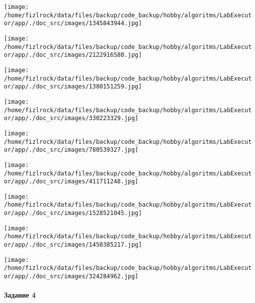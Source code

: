 \documentclass[a4paper, 12pt]{article}
\begin{document}
\texttt{[image: /home/fizlrock/data/files/backup/code\_backup/hobby/algoritms/LabExecutor/app/./doc\_src/images/1345843944.jpg]}

\texttt{[image: /home/fizlrock/data/files/backup/code\_backup/hobby/algoritms/LabExecutor/app/./doc\_src/images/2122916580.jpg]}

\texttt{[image: /home/fizlrock/data/files/backup/code\_backup/hobby/algoritms/LabExecutor/app/./doc\_src/images/1380151259.jpg]}

\texttt{[image: /home/fizlrock/data/files/backup/code\_backup/hobby/algoritms/LabExecutor/app/./doc\_src/images/330223329.jpg]}

\texttt{[image: /home/fizlrock/data/files/backup/code\_backup/hobby/algoritms/LabExecutor/app/./doc\_src/images/780539327.jpg]}

\texttt{[image: /home/fizlrock/data/files/backup/code\_backup/hobby/algoritms/LabExecutor/app/./doc\_src/images/411711248.jpg]}

\texttt{[image: /home/fizlrock/data/files/backup/code\_backup/hobby/algoritms/LabExecutor/app/./doc\_src/images/1528521045.jpg]}

\texttt{[image: /home/fizlrock/data/files/backup/code\_backup/hobby/algoritms/LabExecutor/app/./doc\_src/images/1450385217.jpg]}

\texttt{[image: /home/fizlrock/data/files/backup/code\_backup/hobby/algoritms/LabExecutor/app/./doc\_src/images/324284962.jpg]}
\pagebreak
\paragraph{Задание 4}
\end{document}
